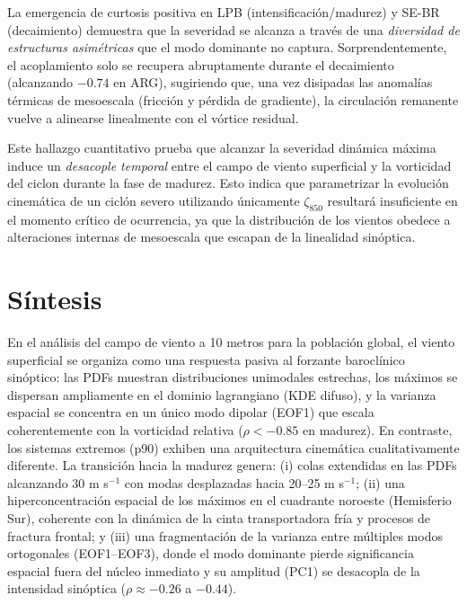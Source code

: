 La emergencia de curtosis positiva en LPB (intensificación/madurez) y SE-BR (decaimiento) demuestra que la severidad se alcanza a través de una \textit{diversidad de estructuras asimétricas} que el modo dominante no captura. Sorprendentemente, el acoplamiento solo se recupera abruptamente durante el decaimiento (alcanzando $-0.74$ en ARG), sugiriendo que, una vez disipadas las anomalías térmicas de mesoescala (fricción y pérdida de gradiente), la circulación remanente vuelve a alinearse linealmente con el vórtice residual.



Este hallazgo cuantitativo prueba que alcanzar la severidad dinámica máxima induce un \textit{desacople temporal} entre el campo de viento superficial y la vorticidad del ciclon durante la fase de madurez. Esto indica que parametrizar la evolución cinemática de un ciclón severo utilizando únicamente $\zeta_{850}$ resultará insuficiente en el momento crítico de ocurrencia, ya que la distribución de los vientos obedece a alteraciones internas de mesoescala que escapan de la linealidad sinóptica. 

\section{Síntesis}\label{sec:sintesis_wind10}

En el análisis del campo de viento a 10 metros para la población global, el viento superficial se organiza como una respuesta pasiva al forzante baroclínico sinóptico: las PDFs muestran distribuciones unimodales estrechas, los máximos se dispersan ampliamente en el dominio lagrangiano (KDE difuso), y la varianza espacial se concentra en un único modo dipolar (EOF1) que escala coherentemente con la vorticidad relativa ($\rho < -0.85$ en madurez). En contraste, los sistemas extremos (p90) exhiben una arquitectura cinemática cualitativamente diferente. La transición hacia la madurez genera: (i) colas extendidas en las PDFs alcanzando 30 m s$^{-1}$ con modas desplazadas hacia 20–25 m s$^{-1}$; (ii) una hiperconcentración espacial de los máximos en el cuadrante noroeste (Hemisferio Sur), coherente con la dinámica de la cinta transportadora fría y procesos de fractura frontal; y (iii) una fragmentación de la varianza entre múltiples modos ortogonales (EOF1–EOF3), donde el modo dominante pierde significancia espacial fuera del núcleo inmediato y su amplitud (PC1) se desacopla de la intensidad sinóptica ($\rho \approx -0.26$ a $-0.44$). 

